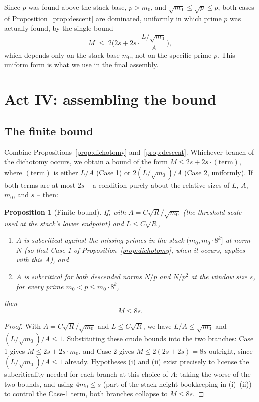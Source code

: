 \documentclass[11pt]{amsart}
\newtheorem{proposition}[theorem]{Proposition}
\theoremstyle{definition}
\theoremstyle{remark}
\begin{document}
Since $p$ was found above the stack base, $p > m_0$, and $\sqrt{m_0}\le \sqrt p \le p$, both cases of Proposition~\ref{prop:descent} are dominated, uniformly in which prime $p$ was actually found, by the single bound
\[
M \;\le\; 2\Big(2s + 2s \cdot \frac{L/\sqrt{m_0}}{A}\Big),
\]
which depends only on the stack base $m_0$, not on the specific prime $p$. This uniform form is what we use in the final assembly.

\section{Act IV: assembling the bound}\label{sec:act4}

\subsection{The finite bound}

Combine Propositions~\ref{prop:dichotomy} and~\ref{prop:descent}. Whichever branch of the dichotomy occurs, we obtain a bound of the form $M \le 2s + 2s\cdot(\text{term})$, where $(\text{term})$ is either $L/A$ (Case 1) or $2(L/\sqrt{m_0})/A$ (Case 2, uniformly). If both terms are at most $2s$ -- a condition purely about the relative sizes of $L$, $A$, $m_0$, and $s$ -- then:

\begin{proposition}[Finite bound]\label{prop:finite}
If, with $A = C\sqrt R/\sqrt{m_0}$ (the threshold scale used at the stack's lower endpoint) and $L \le C\sqrt R$,
\begin{enumerate}[label=(\roman*)]
\item $A$ is subcritical against the missing primes in the stack $(m_0, m_0\cdot 8^k]$ at norm $N$ (so that Case 1 of Proposition~\ref{prop:dichotomy}, when it occurs, applies with this $A$), and
\item $A$ is subcritical for both descended norms $N/p$ and $N/p^2$ at the window size $s$, for every prime $m_0 < p \le m_0\cdot 8^k$,
\end{enumerate}
then
\[
M \le 8s.
\]
\end{proposition}

\begin{proof}
With $A=C\sqrt R/\sqrt{m_0}$ and $L\le C\sqrt R$, we have $L/A \le \sqrt{m_0}$ and $(L/\sqrt{m_0})/A \le 1$. Substituting these crude bounds into the two branches: Case 1 gives $M\le 2s+2s\cdot m_0$, and Case 2 gives $M \le 2(2s+2s)=8s$ outright, since $(L/\sqrt{m_0})/A \le 1$ already. Hypotheses (i) and (ii) exist precisely to license the subcriticality needed for each branch at this choice of $A$; taking the worse of the two bounds, and using $4m_0 \le s$ (part of the stack-height bookkeeping in (i)--(ii)) to control the Case-1 term, both branches collapse to $M\le 8s$.
\end{proof}
\end{document}
